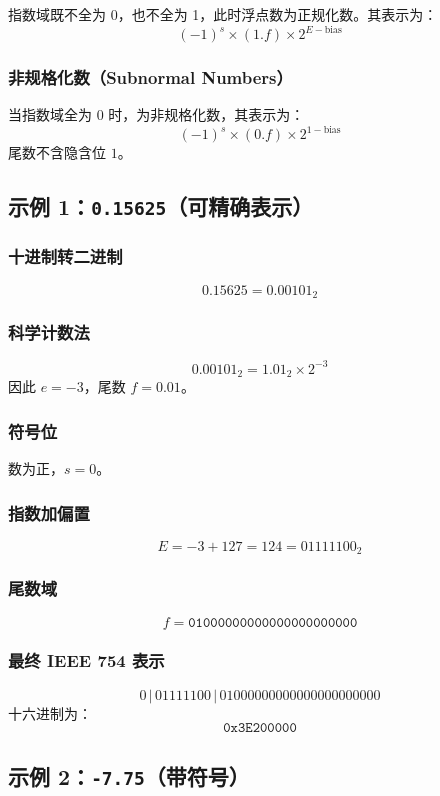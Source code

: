 指数域既不全为 0，也不全为 1，此时浮点数为正规化数。其表示为：
\[
(-1)^s \times (1.f) \times 2^{E - \mathrm{bias}}
\]

\subsubsection{非规格化数（Subnormal Numbers）}

当指数域全为 0 时，为非规格化数，其表示为：
\[
(-1)^s \times (0.f) \times 2^{1-\mathrm{bias}}
\]
尾数不含隐含位 $1$。

\subsection{示例 1：\texttt{0.15625}（可精确表示）}

\subsubsection*{十进制转二进制}
\[
0.15625 = 0.00101_2
\]

\subsubsection*{科学计数法}
\[
0.00101_2 = 1.01_2 \times 2^{-3}
\]
因此 $e=-3$，尾数 $f=0.01$。

\subsubsection*{符号位}
数为正，$s = 0$。

\subsubsection*{指数加偏置}
\[
E = -3 + 127 = 124 = 01111100_2
\]

\subsubsection*{尾数域}
\[
f = \texttt{01000000000000000000000}
\]

\subsubsection*{最终 IEEE 754 表示}
\[
0 \,|\, 01111100 \,|\, 01000000000000000000000
\]
十六进制为：
\[
\texttt{0x3E200000}
\]

\subsection{示例 2：\texttt{-7.75}（带符号）}

